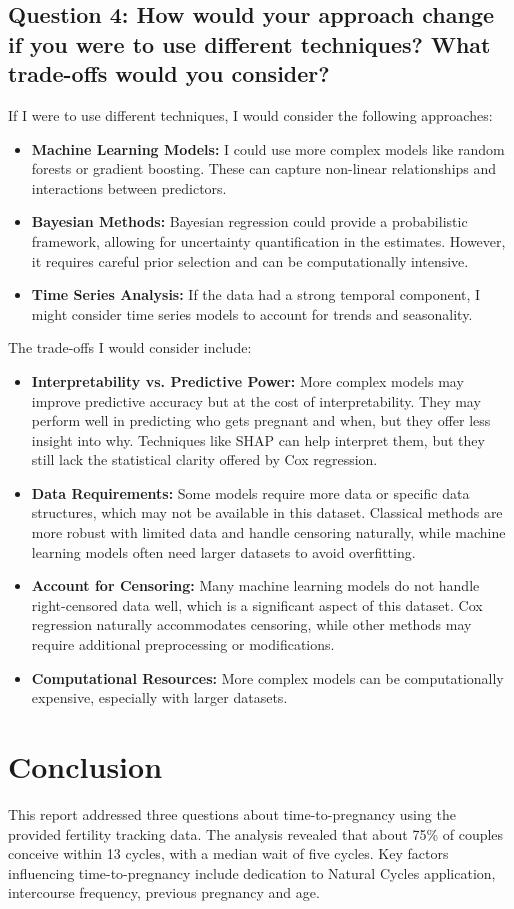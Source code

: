 \documentclass[11pt,a4paper]{article}
\begin{document}
\subsection{Question 4: How would your approach change if you were to use diﬀerent techniques? What trade-oﬀs would you consider?}

If I were to use different techniques, I would consider the following approaches:
\begin{itemize}
  \item \textbf{Machine Learning Models:} I could use more complex models like random forests or gradient boosting. These can capture non-linear relationships and interactions between predictors.
  \item \textbf{Bayesian Methods:} Bayesian regression could provide a probabilistic framework, allowing for uncertainty quantification in the estimates. However, it requires careful prior selection and can be computationally intensive.
  \item \textbf{Time Series Analysis:} If the data had a strong temporal component, I might consider time series models to account for trends and seasonality.
\end{itemize}
The trade-offs I would consider include:
\begin{itemize}
  \item \textbf{Interpretability vs. Predictive Power:} More complex models may improve predictive accuracy but at the cost of interpretability. They may perform well in predicting who gets pregnant and when, but they offer less insight into why. Techniques like SHAP can help interpret them, but they still lack the statistical clarity offered by Cox regression.
  \item \textbf{Data Requirements:} Some models require more data or specific data structures, which may not be available in this dataset. Classical methods are more robust with limited data and handle censoring naturally, while machine learning models often need larger datasets to avoid overfitting.
  \item \textbf{Account for Censoring:} Many machine learning models do not handle right-censored data well, which is a significant aspect of this dataset. Cox regression naturally accommodates censoring, while other methods may require additional preprocessing or modifications.
  \item \textbf{Computational Resources:} More complex models can be computationally expensive, especially with larger datasets.
\end{itemize}
\section{Conclusion}
This report addressed three questions about time-to-pregnancy using the provided fertility tracking data. The analysis revealed that about 75\% of couples conceive within 13 cycles, with a median wait of five cycles. Key factors influencing time-to-pregnancy include dedication to Natural Cycles application, intercourse frequency, previous pregnancy and age.


\end{document}
